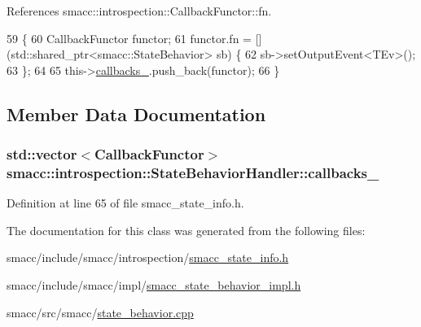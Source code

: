References smacc\+::introspection\+::\+Callback\+Functor\+::fn.


\begin{DoxyCode}
59 \{
60     CallbackFunctor functor;
61     functor.fn = [](std::shared\_ptr<smacc::StateBehavior> sb) \{
62         sb->setOutputEvent<TEv>();
63     \};
64 
65     this->\hyperlink{classsmacc_1_1introspection_1_1StateBehaviorHandler_acb0abaf0d56fa700925a39f1d062ed55}{callbacks\_}.push\_back(functor);
66 \}
\end{DoxyCode}


\subsection{Member Data Documentation}
\subsubsection[{\texorpdfstring{callbacks\+\_\+}{callbacks_}}]{\setlength{\rightskip}{0pt plus 5cm}std\+::vector$<${\bf Callback\+Functor}$>$ smacc\+::introspection\+::\+State\+Behavior\+Handler\+::callbacks\+\_\+\hspace{0.3cm}{\ttfamily [private]}}\hypertarget{classsmacc_1_1introspection_1_1StateBehaviorHandler_acb0abaf0d56fa700925a39f1d062ed55}{}\label{classsmacc_1_1introspection_1_1StateBehaviorHandler_acb0abaf0d56fa700925a39f1d062ed55}


Definition at line 65 of file smacc\+\_\+state\+\_\+info.\+h.



The documentation for this class was generated from the following files\+:\begin{DoxyCompactItemize}
\item 
smacc/include/smacc/introspection/\hyperlink{smacc__state__info_8h}{smacc\+\_\+state\+\_\+info.\+h}\item 
smacc/include/smacc/impl/\hyperlink{smacc__state__behavior__impl_8h}{smacc\+\_\+state\+\_\+behavior\+\_\+impl.\+h}\item 
smacc/src/smacc/\hyperlink{state__behavior_8cpp}{state\+\_\+behavior.\+cpp}\end{DoxyCompactItemize}
